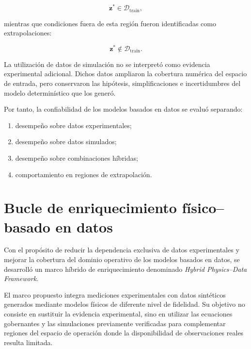 \begin{equation}
\mathbf{z}^{*}
\in
\mathcal{D}_{\mathrm{train}},
\end{equation}

mientras que condiciones fuera de esta región fueron identificadas como extrapolaciones:

\begin{equation}
\mathbf{z}^{*}
\notin
\mathcal{D}_{\mathrm{train}}.
\end{equation}

La utilización de datos de simulación no se interpretó como evidencia experimental adicional. Dichos datos ampliaron la cobertura numérica del espacio de entrada, pero conservaron las hipótesis, simplificaciones e incertidumbres del modelo determinístico que los generó.

Por tanto, la confiabilidad de los modelos basados en datos se evaluó separando:

\begin{enumerate}
    \item desempeño sobre datos experimentales;
    \item desempeño sobre datos simulados;
    \item desempeño sobre combinaciones híbridas;
    \item comportamiento en regiones de extrapolación.
\end{enumerate}

\section{Bucle de enriquecimiento físico--basado en datos}
\label{sec:hybrid_physics_data_framework}

Con el propósito de reducir la dependencia exclusiva de datos experimentales y mejorar la cobertura del dominio operativo de los modelos basados en datos, se desarrolló un marco híbrido de enriquecimiento denominado \textit{Hybrid Physics--Data Framework}.

El marco propuesto integra mediciones experimentales con datos sintéticos generados mediante modelos físicos de diferente nivel de fidelidad. Su objetivo no consiste en sustituir la evidencia experimental, sino en utilizar las ecuaciones gobernantes y las simulaciones previamente verificadas para complementar regiones del espacio de operación donde la disponibilidad de observaciones reales resulta limitada.

